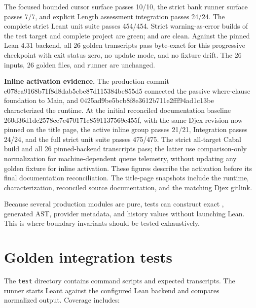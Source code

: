 \documentclass[10pt,letterpaper,oneside]{report}
\newcommand{\code}[1]{\texttt{\detokenize{#1}}}
\newcommand{\filepath}[1]{\nolinkurl{#1}}
\newcommand{\commitid}[1]{{\ttfamily\footnotesize #1}}
\begin{document}
The focused bounded cursor surface passes 10/10, the strict bank runner surface
passes 7/7, and explicit Length assessment integration passes 24/24. The
complete strict Leant unit suite passes 454/454. Strict warning-as-error builds
of the test target and complete project are green; \code{cabal check} and
\code{git diff --check} are clean. Against the pinned Lean 4.31 backend, all 26
golden transcripts pass byte-exact for this progressive checkpoint with exit
status zero, no update mode, and no fixture drift. The 26 inputs, 26 golden
files, and runner are unchanged.

\textbf{Inline activation evidence.} The production commit
\commitid{e078ca9168b71f8d8dab5cbe87d115384be855d5} connected the passive
where-clause foundation to Main, and
\commitid{0425ad9be5bcb8f8e3612b711e2fff94ad1c13be} characterized the runtime.
At the initial reconciled documentation baseline
\commitid{260d36d1dc2578ce7e470171c8591137569e455f}, with the same Djex revision
now pinned on the title page, the active inline group
passes 21/21, Integration passes 24/24, and the full strict unit suite passes
475/475. The strict all-target Cabal build and all 26 pinned-backend transcripts pass;
the latter use comparison-only normalization for machine-dependent queue
telemetry, without updating any golden fixture for inline activation. These
figures describe the activation before its final documentation reconciliation.
The title-page snapshots include the runtime, characterization, reconciled
source documentation, and the matching Djex gitlink.

Because several production modules are pure, tests can construct exact \code{Frag}, generated AST, provider metadata, and history values without launching Lean. This is where boundary invariants should be tested exhaustively.

\section{Golden integration tests}

The \filepath{test} directory contains command scripts and expected transcripts. The runner starts Leant against the configured Lean backend and compares normalized output. Coverage includes:
\end{document}
